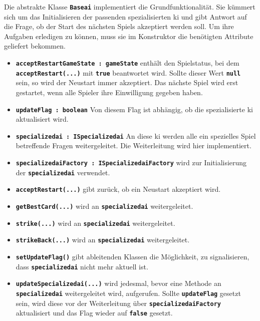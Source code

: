 \documentclass[
							a4paper, 
							11pt, 
							openany, 
							liststotoc,
							parskip=half, 
   							headings=normal
						]{scrreprt}
\begin{document}
{Die abstrakte Klasse \textbf{\texttt{Base\acs{ai}}} implementiert die Grundfunktionalität. Sie kümmert sich um das Initialisieren der passenden spezialisierten \acs{ki} und gibt Antwort auf die Frage, ob der Start des nächsten Spiels akzeptiert werden soll. Um ihre Aufgaben erledigen zu können, muss sie im Konstruktor die benötigten Attribute geliefert bekommen.
\begin{itemize}
	\item \textbf{\texttt{acceptRestartGameState : gameState}} enthält den Spielstatus, bei dem \textbf{\texttt{ac\-cept\-Re\-start(...)}} mit \textbf{\texttt{true}} beantwortet wird. Sollte dieser Wert \textbf{\texttt{null}} sein, so wird der Neustart immer akzeptiert. Das nächste Spiel wird erst gestartet, wenn alle Spieler ihre Einwilligung gegeben haben.
	\item \textbf{\texttt{updateFlag : boolean}} Von diesem Flag ist abhängig, ob die spezialisierte \acs{ki} aktualisiert wird.
	\item \textbf{\texttt{specialized\acs{ai} : ISpecialized\acs{ai}}} An diese \acs{ki} werden alle ein spezielles Spiel betreffende Fragen weitergeleitet. Die Weiterleitung wird hier implementiert.
	\item \textbf{\texttt{specialized\acs{ai}Factory : ISpecialized\acs{ai}Factory}} wird zur Initialisierung der \textbf{\texttt{specialized\acs{ai}}} verwendet.
	\item \textbf{\texttt{acceptRestart(...)}} gibt zurück, ob ein Neustart akzeptiert wird.
	\item \textbf{\texttt{getBestCard(...)}} wird an \textbf{\texttt{specialized\acs{ai}}} weitergeleitet.
	\item \textbf{\texttt{strike(...)}} wird an \textbf{\texttt{specialized\acs{ai}}} weitergeleitet.
	\item \textbf{\texttt{strikeBack(...)}} wird an \textbf{\texttt{specialized\acs{ai}}} weitergeleitet.	
	\item \textbf{\texttt{setUpdateFlag()}} gibt ableitenden Klassen die Möglichkeit, zu signalisieren, dass \textbf{\texttt{specialized\acs{ai}}} nicht mehr aktuell ist.
	\item \textbf{\texttt{updateSpecialized\acs{ai}(...)}} wird jedesmal, bevor eine Methode an \textbf{\texttt{spe\-ci\-ali\-zed\-\acs{ai}}} weitergeleitet wird, aufgerufen. Sollte \textbf{\texttt{updateFlag}} gesetzt sein, wird diese vor der Weiterleitung über \textbf{\texttt{specialized\acs{ai}Factory}} aktualisiert und das Flag wieder auf \textbf{\texttt{false}} gesetzt.
\end{itemize}\bigskip

}
\end{document}
